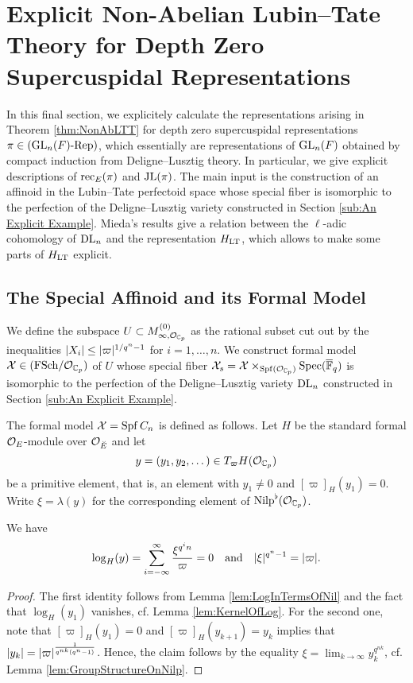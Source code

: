 \documentclass[../main.tex]{subfiles}
\begin{document}
\section{Explicit Non-Abelian Lubin--Tate Theory for Depth Zero Supercuspidal
Representations} %
\label{sec:Explicit Non-Abelian Lubin-Tate Theory for Depth Zero Supercuspidal Representations}

In this final section, we explicitely calculate the representations
arising in Theorem \ref{thm:NonAbLTT} for depth zero supercuspidal
representations $\pi \in {({\operatorname{GL}_n(F)}\text-\allowbreak\mathrm{Rep})}$, which essentially are representations
of $\operatorname{GL}_n(F)$
obtained by compact induction from Deligne--Lusztig theory. In
particular, we give explicit descriptions of $\mathrm{rec}_E(\pi)$ and $\mathrm{JL}(\pi)$. 
The main input is the construction of an affinoid in the Lubin--Tate perfectoid
space whose special fiber is isomorphic to the perfection of the 
Deligne--Lusztig variety constructed in Section \ref{sub:An Explicit Example}.
Mieda's results give a relation between the $\ell$-adic cohomology of $\mathrm{DL}_n$
and the representation $H_{\mathrm{LT}}$, which allows to make some parts of $H_{\mathrm{LT}}$
explicit.

\subsection{The Special Affinoid and its Formal Model} %
\label{sub:The Special Affinoid}
We define the subspace $U \subset M_{\infty,\mathcal{O}_{\mathbb{C}_p}}^{(0)}$ as the rational subset cut out
by the inequalities $\lvert X_i \rvert \leq \lvert \varpi \rvert^{1/q^n-1}$ for $i = 1, \dots, n$. 
We construct formal model $\mathcal{X} \in {(\mathrm{FSch}/{\mathcal{O}_{\mathbb{C}_p}})}$ of $U$ whose special fiber $\mathcal{X}_s = 
\mathcal{X} \times_{\operatorname{Spf}(\mathcal{O}_{\mathbb{C}_p})}\operatorname{Spec}(\overline {\mathbb{F}}_q)$ is isomorphic to the perfection of the
Deligne--Lusztig variety $\mathrm{DL}_n$ constructed in Section \ref{sub:An Explicit Example}.

The formal model $\mathcal{X} = \operatorname{Spf} C_n$ is defined as follows. Let $H$
be the standard
formal $\mathcal{O}_E$-module over $\mathcal{O}_{\breve {E}}$ and let 
$$y = (y_1, y_2, \dots) \in T_\varpi H(\mathcal{O}_{\mathbb{C}_p})$$ be a primitive element, that is,
an element with $y_1 \neq 0$ and $[\varpi]_H(y_1) = 0$. Write $\xi = \lambda(y)$ 
for the corresponding element of ${\mathrm{Nilp}}^\flat(\mathcal{O}_{\mathbb{C}_p})$. 

\begin{lem}\label{lem:PropertiesOfXi}
  We have 
  \begin{equation*}
    \log_H(y) = \sum_{i = -\infty}^ \infty \frac{\xi^{q^in}}{\varpi} = 0
    \quad \text{and} \quad
    \lvert \xi \rvert^{q^n-1} = \lvert \varpi \rvert.
  \end{equation*}
\begin{proof}
  The first identity follows from Lemma \ref{lem:LogInTermsOfNil} and the fact that
  $\log_H(y_1)$ vanishes, cf. Lemma \ref{lem:KernelOfLog}. 
  For the second one, note that $[\varpi]_H(y_1) = 0$ and 
  $[\varpi]_H(y_{k+1}) = y_k$ implies that 
  $\lvert y_k \rvert = \lvert \varpi \rvert^{\frac{1}{q^{nk}(q^n-1)}}$. Hence, the claim follows by
  the equality $\xi = \lim_{k \to \infty} y_k^{q^{nk}}$, cf. Lemma
  \ref{lem:GroupStructureOnNilp}.
\end{proof}
\end{lem}
\end{document}
